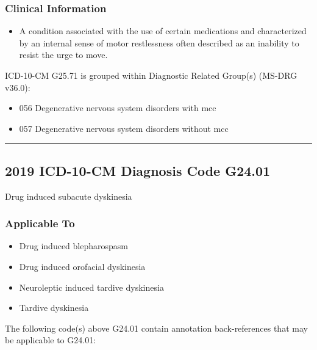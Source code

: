\hypertarget{clinical-information}{%
\subsubsection{Clinical Information}\label{clinical-information}}

\begin{itemize}
\tightlist
\item
  A condition associated with the use of certain medications and characterized by an internal sense of motor restlessness often described as an inability to resist the urge to move.
\end{itemize}

\noindent ICD-10-CM G25.71 is grouped within Diagnostic Related Group(s) (MS-DRG v36.0):

\begin{itemize}
\tightlist
\item
  056 Degenerative nervous system disorders with mcc
\item
  057 Degenerative nervous system disorders without mcc
\end{itemize}

\begin{center}\rule{0.5\linewidth}{\linethickness}\end{center}

\hypertarget{icd-10-cm-diagnosis-code-g24.01}{%
\subsection{2019 ICD-10-CM Diagnosis Code G24.01}\label{icd-10-cm-diagnosis-code-g24.01}}

\noindent Drug induced subacute dyskinesia

\hypertarget{applicable-to-2}{%
\subsubsection{Applicable To}\label{applicable-to-2}}

\begin{itemize}
\tightlist
\item
  Drug induced blepharospasm
\item
  Drug induced orofacial dyskinesia
\item
  Neuroleptic induced tardive dyskinesia
\item
  Tardive dyskinesia
\end{itemize}

\noindent The following code(s) above G24.01 contain annotation back-references that may be applicable to G24.01:

